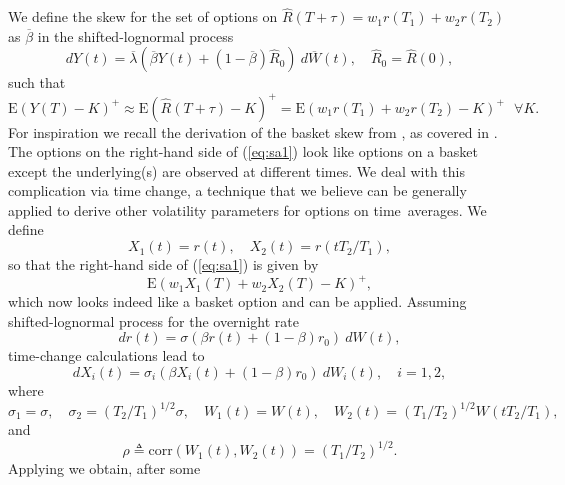 \documentclass{article}
\begin{document}
We define the skew for the set of options on $\widehat{R}(T+\tau
)=w_{1}r(T_{1})+w_{2}r(T_{2})$ as $\overline{\beta }$ in the
shifted-lognormal process%
\begin{equation*}
dY(t)=\overline{\lambda }(\overline{\beta }Y(t)+(1-\overline{\beta })%
\widehat{R}_{0})~d\overline{W}(t),\quad \widehat{R}_{0}=\widehat{R}(0),
\end{equation*}%
such that 
\begin{equation}
\mathrm{E}\left( Y(T)-K\right) ^{+}\approx \mathrm{E}\left( \widehat{R}%
(T+\tau )-K\right) ^{+}=\mathrm{E}\left(
w_{1}r(T_{1})+w_{2}r(T_{2})-K\right) ^{+}\text{ }\forall K.  \label{eq:sa1}
\end{equation}%
For inspiration we recall the derivation of the basket skew from \cite%
{ant-mis}, as covered in \cite[Section A.4]{ap-book}. The options on the
right-hand side of (\ref{eq:sa1}) look like options on a basket except the
underlying(s) are observed at different times. We deal with this
complication via time change, a technique that we believe can be generally
applied to derive other volatility parameters for options on time\ averages.
We define%
\begin{equation*}
X_{1}(t)=r(t),\quad X_{2}(t)=r(tT_{2}/T_{1}),
\end{equation*}%
so that the right-hand side of (\ref{eq:sa1}) is given by%
\begin{equation*}
\mathrm{E}\left( w_{1}X_{1}(T)+w_{2}X_{2}(T)-K\right) ^{+},
\end{equation*}%
which now looks indeed like a basket option and \cite[Section A.4]{ap-book}
can be applied. Assuming shifted-lognormal process for the overnight rate%
\begin{equation*}
dr(t)=\sigma (\beta r(t)+(1-\beta )r_{0})~dW(t),
\end{equation*}%
time-change calculations lead to%
\begin{equation*}
dX_{i}(t)=\sigma _{i}(\beta X_{i}(t)+(1-\beta )r_{0})~dW_{i}(t),\quad i=1,2,
\end{equation*}%
where%
\begin{equation*}
\sigma _{1}=\sigma ,\quad \sigma _{2}=\left( T_{2}/T_{1}\right) ^{1/2}\sigma
,\quad W_{1}(t)=W(t),\quad W_{2}(t)=\left( T_{1}/T_{2}\right)
^{1/2}W(tT_{2}/T_{1}),
\end{equation*}%
and%
\begin{equation*}
\rho \triangleq \mathrm{corr}(W_{1}(t),W_{2}(t))=\left( T_{1}/T_{2}\right)
^{1/2}.
\end{equation*}%
Applying \cite[Proposition A.4.1]{ap-book} we obtain, after some
\end{document}
